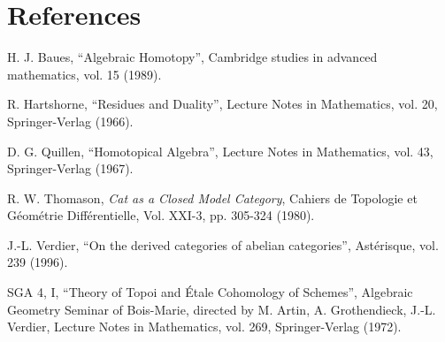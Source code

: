 
\section*{References}

\noindent H. J. Baues, ``Algebraic Homotopy'', Cambridge studies in advanced mathematics, vol. 15 (1989).

\noindent R. Hartshorne, ``Residues and Duality'', Lecture Notes in Mathematics, vol. 20, Springer-Verlag (1966).

\noindent D. G. Quillen, ``Homotopical Algebra'', Lecture Notes in Mathematics, vol. 43, Springer-Verlag (1967).

\noindent R. W. Thomason, \textit{Cat as a Closed Model Category}, Cahiers de Topologie et Géométrie Différentielle, Vol. XXI-3, pp. 305-324 (1980).

\noindent J.-L. Verdier, ``On the derived categories of abelian categories'', Astérisque, vol. 239 (1996).

\noindent SGA 4, I, ``Theory of Topoi and Étale Cohomology of Schemes'', Algebraic Geometry Seminar of Bois-Marie, directed by M. Artin, A. Grothendieck, J.-L. Verdier, Lecture Notes in Mathematics, vol. 269, Springer-Verlag (1972).